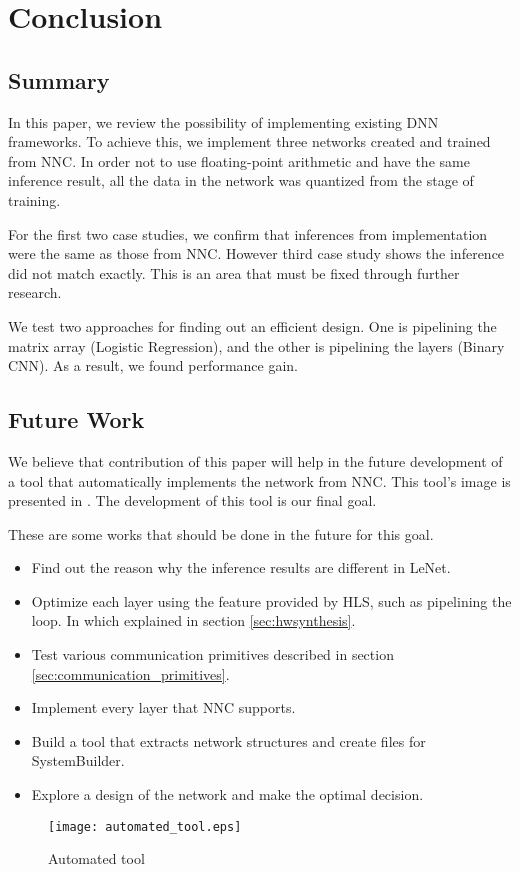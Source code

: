 
\chapter{Conclusion}

\section{Summary}

In this paper, we review the possibility of implementing existing DNN frameworks. To achieve this, we implement three networks created and trained from NNC. In order not to use floating-point arithmetic and have the same inference result, all the data in the network was quantized from the stage of training.

For the first two case studies, we confirm that inferences from implementation were the same as those from NNC. However third case study shows the inference did not match exactly. This is an area that must be fixed through further research.

We test two approaches for finding out an efficient design. One is pipelining the matrix array (Logistic Regression), and the other is pipelining the layers (Binary CNN). As a result, we found performance gain.



\section{Future Work}
We believe that contribution of this paper will help in the future development of a tool that automatically implements the network from NNC. This tool's image is presented in . The development of this tool is our final goal.

These are some works that should be done in the future for this goal.
\begin{itemize}
  \item Find out the reason why the inference results are different in LeNet.
  \item Optimize each layer using the feature provided by HLS, such as pipelining the loop. In which explained in section \ref{sec:hwsynthesis}.
  \item Test various communication primitives described in section \ref{sec:communication_primitives}.
  \item Implement every layer that NNC supports.
  \item Build a tool that extracts network structures and create files for SystemBuilder.
  \item Explore a design of the network and make the optimal decision.
\end{itemize}

\begin{figure}[btp]
\centering
\texttt{[image: automated\_tool.eps]}
\caption{Automated tool}
\label{fig:autotool}
\end{figure}
